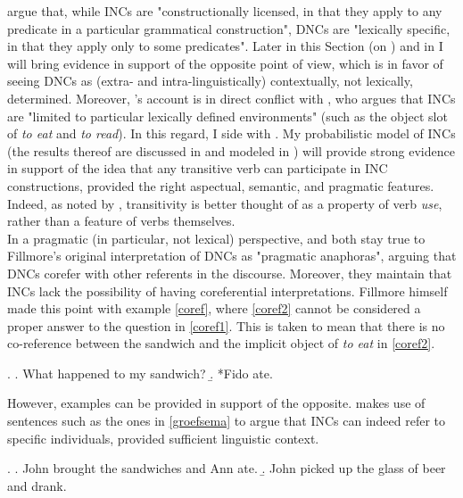 \textcite[55]{TonelliDelmonte2011} argue that, while INCs are "constructionally licensed, in that they apply to any predicate in a particular grammatical construction", DNCs are "lexically specific, in that they apply only to some predicates". Later in this Section (on ) and in  I will bring evidence in support of the opposite point of view, which is in favor of seeing DNCs as (extra- and intra-linguistically) contextually, not lexically, determined. Moreover, \textcite{TonelliDelmonte2011}'s account is in direct conflict with \textcite[95]{Fillmore1986}, who argues that INCs are "limited to particular lexically defined environments" (such as the object slot of \textit{to eat} and \textit{to read}). In this regard, I side with \textcite{TonelliDelmonte2011}. My probabilistic model of INCs (the results thereof are discussed in  and modeled in ) will provide strong evidence in support of the idea that any transitive verb can participate in INC constructions, provided the right aspectual, semantic, and pragmatic features. Indeed, as noted by \textcite[216]{HuddlestonEtAl2002}, transitivity is better thought of as a property of verb \textit{use}, rather than a feature of verbs themselves.\\
In a pragmatic (in particular, not lexical) perspective, \textcite[44]{AnderBois} and \textcite[53-54]{Melchin2019} both stay true to Fillmore's original interpretation of DNCs as "pragmatic anaphoras", arguing that DNCs corefer with other referents in the discourse. Moreover, they maintain that INCs lack the possibility of having coreferential interpretations. Fillmore himself \parencite[97]{Fillmore1986} made this point with example \ref{coref}, where \ref{coref2} cannot be considered a proper answer to the question in \ref{coref1}. This is taken to mean that there is no co-reference between the sandwich and the implicit object of \textit{to eat} in \ref{coref2}.

\ex. \label{coref} \a. \label{coref1} What happened to my sandwich?
\b. \label{coref2} *Fido ate.

However, examples can be provided in support of the opposite. \textcite[142-144]{groefsema1995understood} makes use of sentences such as the ones in \ref{groefsema} to argue that INCs can indeed refer to specific individuals, provided sufficient linguistic context.

\ex. \label{groefsema} \a. \label{groefsema1} John brought the sandwiches and Ann ate.
\b. \label{groefsema2} John picked up the glass of beer and drank.


